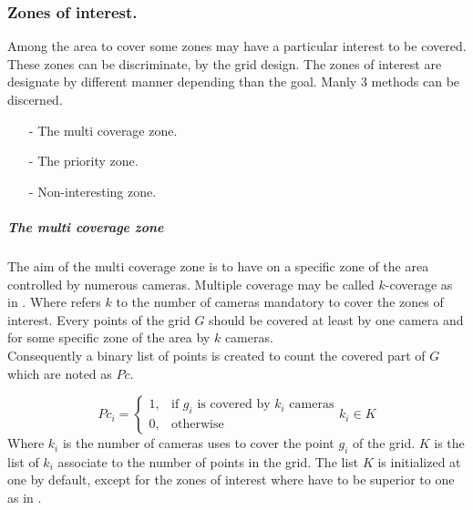 \subsubsection{Zones of interest.} \label{sec:zoneOfInterest}
Among the area to cover some zones may have a particular interest to be covered. These zones can be discriminate, by the grid design. 
The zones of interest are designate by different manner depending than the goal. Manly 3 methods can be discerned.
\begin{itemize}
	\item[-]	The multi coverage zone. 
	\item[-]	The priority zone.  
	\item[-]	Non-interesting zone.
\end{itemize}
 

\subparagraph{The multi coverage zone}
The aim  of the multi coverage zone is to have on a specific zone of the area controlled by numerous cameras.  Multiple coverage may be called $k$-coverage as in \cite{174*zhang2016}. Where refers $k$ to the number of cameras mandatory to cover the zones of interest. 
Every points of the grid $G$ should be covered at least by one camera and for some specific zone of the area by $k$ cameras.\\
 Consequently a binary list of points is created to count the covered part of $G$ which are noted as $Pc$.

\begin{equation}\label{eq:PciK}
Pc_i= \begin{cases} 1, & \mbox{if } g_i\mbox{ is covered by $k_i$ cameras} \\ 0, & \mbox{otherwise}   \end{cases}k_i \in K
\end{equation}
Where $k_i$ is the number of cameras uses to cover the point $g_i$ of the grid. $K$ is the list of $k_i$ associate to the number of points in the grid. The list $K$ is initialized at one by default, except for the zones of interest where have to be superior to one as in \cite{82*chrysostomou2012}. 

